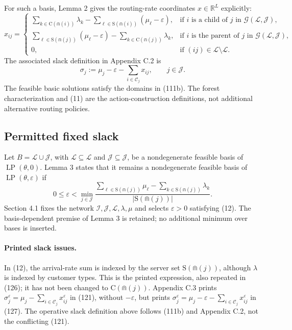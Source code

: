 \documentclass{article}
\begin{document}
For such a basis, Lemma 2 gives the routing-rate coordinates $x\in\mathbb R^L$ explicitly:
\begin{equation}
x_{ij}=\begin{cases}
\displaystyle\sum_{k\in\mathrm C(\Cap(i))}\lambda_k
-\sum_{\ell\in\mathrm S(\Cap(i))}(\mu_\ell-\varepsilon),
&\text{if }i\text{ is a child of }j\text{ in }\mathcal G(\mathscr L,\mathscr J),\\[6pt]
\displaystyle\sum_{\ell\in\mathrm S(\Cap(j))}(\mu_\ell-\varepsilon)
-\sum_{k\in\mathrm C(\Cap(j))}\lambda_k,
&\text{if }i\text{ is the parent of }j\text{ in }\mathcal G(\mathscr L,\mathscr J),\\[6pt]
0,&\text{if }(ij)\in\mathcal L\setminus\mathscr L.
\end{cases}
\tag{11}
\end{equation}
The associated slack definition in Appendix C.2 is
\[
\sigma_j:=\mu_j-\varepsilon-\sum_{i\in\mathcal C_j}x_{ij},
\qquad j\in\mathcal J.
\]
The feasible basic solutions satisfy the domains in (111b). The forest characterization and (11) are the action-construction definitions, not additional alternative routing policies.

\subsection*{Permitted fixed slack}

Let $B=\mathscr L\cup\mathscr J$, with $\mathscr L\subseteq\mathcal L$ and $\mathscr J\subseteq\mathcal J$, be a nondegenerate feasible basis of $\operatorname{LP}(\theta,0)$. Lemma 3 states that it remains a nondegenerate feasible basis of $\operatorname{LP}(\theta,\varepsilon)$ if
\begin{equation}
0\leq\varepsilon<\min_{j\in\mathcal J}
\frac{\displaystyle\sum_{\ell\in\mathrm S(\Cap(j))}\mu_\ell
-\displaystyle\sum_{k\in\mathrm S(\Cap(j))}\lambda_k}
{|\mathrm S(\Cap(j))|}.
\tag{12}
\end{equation}
Section 4.1 fixes the network $\mathcal I,\mathcal J,\mathcal L,\lambda,\mu$ and selects $\varepsilon>0$ satisfying (12). The basis-dependent premise of Lemma 3 is retained; no additional minimum over bases is inserted.

\paragraph{Printed slack issues.}
In (12), the arrival-rate sum is indexed by the server set $\mathrm S(\Cap(j))$, although $\lambda$ is indexed by customer types. This is the printed expression, also repeated in (126); it has not been changed to $\mathrm C(\Cap(j))$. Appendix C.3 prints $\sigma_j^\varepsilon=\mu_j-\sum_{i\in\mathcal C_j}x_{ij}^\varepsilon$ in (121), without $-\varepsilon$, but prints $\sigma_j^\varepsilon=\mu_j-\varepsilon-\sum_{i\in\mathcal C_j}x_{ij}^\varepsilon$ in (127). The operative slack definition above follows (111b) and Appendix C.2, not the conflicting (121).
\end{document}
